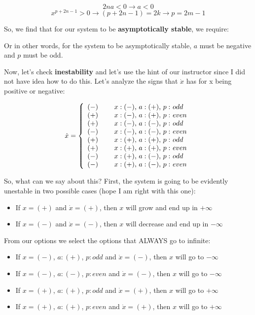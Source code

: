 \documentclass[10pt,a4paper]{article}
\begin{document}
\[ 2na < 0 \rightarrow a < 0 \]
\[ x^{p+2n-1} > 0 \rightarrow (p+2n-1) = 2k \rightarrow p = 2m-1 \]

So, we find that for our system to be \textbf{asymptotically stable}, we require:
\begin{center}
\end{center}

Or in other words, for the system to be asymptotically stable, $a$ must be negative and $p$ must be odd.
\medskip

Now, let's check \textbf{inestability} and let's use the hint of our instructor since I did not have idea how to do this. Let's analyze the signs that $\dot{x}$ has for x being positive or negative:

\[
\dot{x} = \left\{
\begin{array}{l l}
(-) & \quad \text{ $x:(-)$, $a:(+)$, $p:$ $odd$} \\
(+) & \quad \text{ $x:(-)$, $a:(+)$, $p:$ $even$} \\
(+) & \quad \text{ $x:(-)$, $a:(-)$, $p:$ $odd$} \\
(-) & \quad \text{ $x:(-)$, $a:(-)$, $p:$ $even$} \\
(+) & \quad \text{ $x:(+)$, $a:(+)$, $p:$ $odd$} \\
(+) & \quad \text{ $x:(+)$, $a:(+)$, $p:$ $even$} \\
(-) & \quad \text{ $x:(+)$, $a:(-)$, $p:$ $odd$} \\
(-) & \quad \text{ $x:(+)$, $a:(-)$, $p:$ $even$} \\
\end{array}
\right. \]

So, what can we say about this? First, the system is going to be evidently unestable in two possible cases (hope I am right with this one):

\begin{itemize}
\item{If $x = (+)$ and $\dot{x} = (+)$, then $x$ will grow and end up in $+\infty$}
\item{If $x = (-)$ and $\dot{x} = (-)$, then $x$ will decrease and end up in $-\infty$}
\end{itemize}

From our options we select the options that ALWAYS go to infinite:

\begin{itemize}
\item{If $x = (-)$, $a:(+)$, $p:odd$  and $\dot{x} = (-)$, then $x$ will go to $-\infty$}
\item{If $x = (-)$, $a:(-)$, $p:even$ and $\dot{x} = (-)$, then $x$ will go to $-\infty$}
\item{If $x = (+)$, $a:(+)$, $p:odd$  and $\dot{x} = (+)$, then $x$ will go to $+\infty$}
\item{If $x = (+)$, $a:(+)$, $p:even$ and $\dot{x} = (+)$, then $x$ will go to $+\infty$}
\end{itemize}
\end{document}
